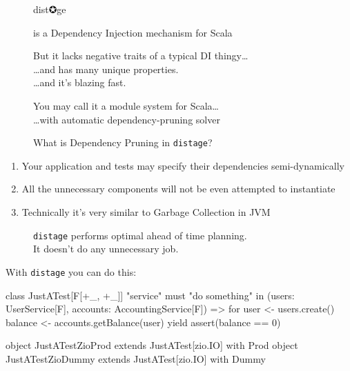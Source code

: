 \documentclass[usenames,dvipsnames,aspectratio=169]{beamer}
\newcommand{\distage}{\texttt{distage}\xspace}
\begin{document}
\begin{frame}
  \begin{figure}
  \Huge \color{RubineRed} dist✪ge
  \end{figure}

  \begin{figure}
  \LARGE is a Dependency Injection mechanism for Scala
  \end{figure}

  \begin{figure}
  \large But it lacks negative traits of a typical DI thingy\dots \\
  \Large \dots and has many unique properties. \\
  \dots and it's blazing fast.
  \end{figure}

  \begin{figure}
  \large You may call it a module system for Scala\dots \\
  \Large \dots with automatic dependency-pruning solver
  \end{figure}
\end{frame}

\begin{frame}
  \begin{figure}
  \Huge What is Dependency Pruning in \distage?
  \end{figure}

  \begin{enumerate}
  \item Your application and tests may specify their dependencies semi-dynamically
  \item All the unnecessary components will not be even attempted to instantiate
  \item Technically it's very similar to Garbage Collection in JVM
  \end{enumerate} 
\end{frame}

\begin{frame}
  \begin{figure}
    \huge \distage performs optimal ahead of time planning.
    \\
    It doesn't  do any unnecessary job.
  \end{figure}
\end{frame}

\begin{frame}[fragile]
With \distage you can do this:

\begin{scalacode}
class JustATest[F[+_, +_]] {
  "service" must {
    "do something" in {
      (users: UserService[F], accounts: AccountingService[F]) =>
      for {
        user  <- users.create()
        balance <- accounts.getBalance(user)
      } yield {
        assert(balance == 0)
      }
    }
  }
}

object JustATestZioProd extends JustATest[zio.IO] with Prod
object JustATestZioDummy extends JustATest[zio.IO] with Dummy
\end{scalacode}
\end{frame}
\end{document}
